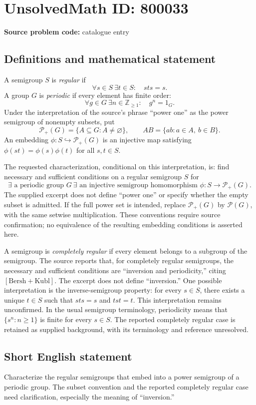 \documentclass[11pt]{article}
\newcommand{\Z}{\mathbb{Z}}
\begin{document}
\section*{UnsolvedMath ID: 800033}
\textbf{Source problem code:} catalogue entry
\subsection{Definitions and mathematical statement}
A semigroup \(S\) is \emph{regular} if
\[
\forall s\in S\ \exists t\in S:\quad sts=s.
\]
A group \(G\) is \emph{periodic} if every element has finite order:
\[
\forall g\in G\ \exists n\in\Z_{\geq 1}:\quad g^n=1_G.
\]
Under the interpretation of the source's phrase ``power one'' as the power semigroup of nonempty subsets, put
\[
\mathcal P_+(G)=\{A\subseteq G:A\ne\varnothing\},
\qquad AB=\{ab:a\in A,\ b\in B\}.
\]
An embedding \(\phi:S\hookrightarrow\mathcal P_+(G)\) is an injective map satisfying \(\phi(st)=\phi(s)\phi(t)\) for all \(s,t\in S\).

The requested characterization, conditional on this interpretation, is: find necessary and sufficient conditions on a regular semigroup \(S\) for
\[
\exists\text{ a periodic group }G\ \exists\text{ an injective semigroup homomorphism }
\phi:S\longrightarrow\mathcal P_+(G).
\]
The supplied excerpt does not define ``power one'' or specify whether the empty subset is admitted. If the full power set is intended, replace \(\mathcal P_+(G)\) by \(\mathcal P(G)\), with the same setwise multiplication. These conventions require source confirmation; no equivalence of the resulting embedding conditions is asserted here.

A semigroup is \emph{completely regular} if every element belongs to a subgroup of the semigroup. The source reports that, for completely regular semigroups, the necessary and sufficient conditions are ``inversion and periodicity,'' citing \([\mathrm{Bersh+Kubl}]\). The excerpt does not define ``inversion.'' One possible interpretation is the inverse-semigroup property: for every \(s\in S\), there exists a unique \(t\in S\) such that \(sts=s\) and \(tst=t\). This interpretation remains unconfirmed. In the usual semigroup terminology, periodicity means that \(\{s^n:n\geq1\}\) is finite for every \(s\in S\). The reported completely regular case is retained as supplied background, with its terminology and reference unresolved.
\subsection{Short English statement}
Characterize the regular semigroups that embed into a power semigroup of a periodic group. The subset convention and the reported completely regular case need clarification, especially the meaning of ``inversion.''
\end{document}
